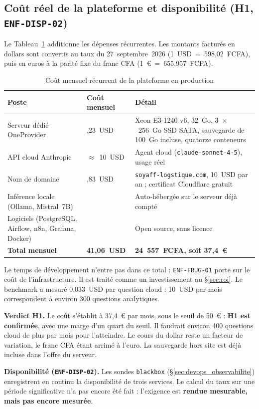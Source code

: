 \subsection{Coût réel de la plateforme et disponibilité (H1, \texttt{ENF-DISP-02})}
\label{sec:impact_cout}

Le Tableau~\ref{tab:impact_cout} additionne les dépenses récurrentes. Les montants facturés en dollars sont convertis au taux du 27~septembre~2026 (1~USD~=~598,02~FCFA), puis en euros à la parité fixe du franc CFA (1~€~=~655,957~FCFA).

\begin{table}[htbp]
\centering
\footnotesize
\caption{Coût mensuel récurrent de la plateforme en production}
\label{tab:impact_cout}
\begin{tabular}{|>{\raggedright\arraybackslash}p{4.2cm}|>{\raggedleft\arraybackslash}p{2.4cm}|>{\raggedright\arraybackslash}p{5.4cm}|}
\hline
\rowcolor[HTML]{EFEFEF}
\textbf{Poste} & \textbf{Coût mensuel} & \textbf{Détail} \\ \hline
Serveur dédié OneProvider & 30,23~USD & Xeon E3-1240 v6, 32~Go, 3~$\times$~256~Go SSD SATA, sauvegarde de 100~Go incluse, quatorze conteneurs \\ \hline
API cloud Anthropic & $\approx$~10~USD & Agent cloud (\texttt{claude-sonnet-4-5}), usage réel \\ \hline
Nom de domaine & 0,83~USD & \texttt{soyaff-logstique.com}, 10~USD par an ; certificat Cloudflare gratuit \\ \hline
Inférence locale (Ollama, Mistral~7B) & 0 & Auto-hébergée sur le serveur déjà compté \\ \hline
Logiciels (PostgreSQL, Airflow, n8n, Grafana, Docker) & 0 & Open source, sans licence \\ \hline
\textbf{Total mensuel} & \textbf{41,06~USD} & \textbf{24~557~FCFA, soit 37,4~€} \\ \hline
\end{tabular}
\end{table}

Le temps de développement n'entre pas dans ce total : \texttt{ENF-FRUG-01} porte sur le coût de l'infrastructure. Il est traité comme un investissement au §\ref{sec:roi}. Le benchmark a mesuré 0,033~USD par question cloud : 10~USD par mois correspondent à environ 300 questions analytiques.

\textbf{Verdict H1.} Le coût s'établit à 37,4~€ par mois, sous le seuil de 50~€ : \textbf{H1 est confirmée}, avec une marge d'un quart du seuil. Il faudrait environ 400 questions cloud de plus par mois pour l'atteindre. Le cours du dollar reste un facteur de variation, le franc CFA étant arrimé à l'euro. La sauvegarde hors site est déjà incluse dans l'offre du serveur.

\textbf{Disponibilité (\texttt{ENF-DISP-02}).} Les sondes \texttt{blackbox} (\S\ref{sec:devops_observabilite}) enregistrent en continu la disponibilité de trois services. Le calcul du taux sur une période significative n'a pas encore été fait : l'exigence est \textbf{rendue mesurable, mais pas encore mesurée}.

